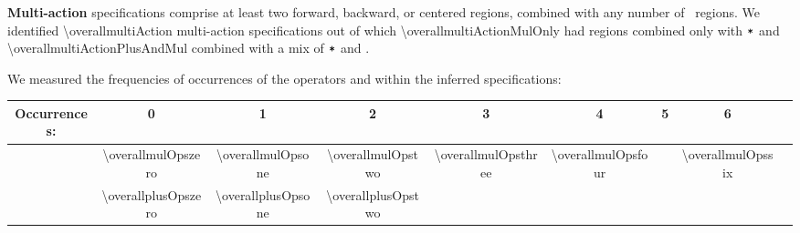 \textbf{Multi-action} specifications comprise at least two
 forward, backward, or centered regions, combined with
any number of \pointed\ regions. We identified \num{\overallmultiAction} multi-action
specifications out of which \num{\overallmultiActionMulOnly} had regions combined only with
$\texttt{*}$ and \num{\overallmultiActionPlusAndMul} combined with a mix of $\texttt{*}$ and \term{+}.




We measured the frequencies of occurrences of the operators \term{*}
and \term{+} within the inferred specifications:
\begin{center}
\vspace{0.25em}
\setlength{\tabcolsep}{0.57em}
{\small{
\hspace{-1em}\begin{tabular}{c|cccccccc}
Occurrences: & 0 & 1 & 2 & 3 & 4 & 5 & 6  \\ \hline
\term{*} & \num{\overallmulOpszero} & \num{\overallmulOpsone} & \num{\overallmulOpstwo} & \num{\overallmulOpsthree} & \num{\overallmulOpsfour} &  & \num{\overallmulOpssix} \\
\term{+} & \num{\overallplusOpszero} & \num{\overallplusOpsone} & \num{\overallplusOpstwo}
\end{tabular}}}
\vspace{0.2em}
\end{center}

